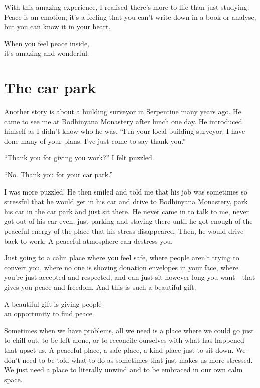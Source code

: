 \documentclass[12pt, openany]{book}
\newenvironment{aphorism}%
{%
\begin{center}\begin{itshape}
}%
{\end{itshape}\end{center}
}%
\begin{document}
With this amazing experience, I realised there’s more to life than just studying. Peace is an emotion; it’s a feeling that you can’t write down in a book or analyse, but you can know it in your heart. 

\begin{aphorism}
When you feel peace inside,\\  
it’s amazing and wonderful.
\end{aphorism}

\section*{The car park}

Another story is about a building surveyor in Serpentine many years ago. He came to see me at Bodhinyana Monastery after lunch one day. He introduced himself as I didn’t know who he was. “I’m your local building surveyor. I have done many of your plans. I’ve just come to say thank you.” 

“Thank you for giving you work?” I felt puzzled. 

“No. Thank you for your car park.” 

I was more puzzled! He then smiled and told me that his job was sometimes so stressful that he would get in his car and drive to Bodhinyana Monastery, park his car in the car park and just sit there. He never came in to talk to me, never got out of his car even, just parking and staying there until he got enough of the peaceful energy of the place that his stress disappeared. Then, he would drive back to work. A peaceful atmosphere can destress you. 

Just going to a calm place where you feel safe, where people aren’t trying to convert you, where no one is shoving donation envelopes in your face, where you’re just accepted and respected, and can just sit however long you want—that gives you peace and freedom. And this is such a beautiful gift. 

\begin{aphorism}
A beautiful gift is giving people\\  
an opportunity to find peace.
\end{aphorism}

Sometimes when we have problems, all we need is a place where we could go just to chill out, to be left alone, or to reconcile ourselves with what has happened that upset us. A peaceful place, a safe place, a kind place just to sit down. We don’t need to be told what to do as sometimes that just makes us more stressed. We just need a place to literally unwind and to be embraced in our own calm space. 
\end{document}
